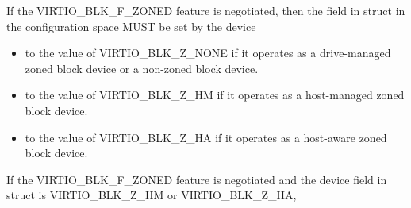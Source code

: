 If the VIRTIO_BLK_F_ZONED feature is negotiated, then the  field in
 struct in the configuration space MUST be set by the device
\begin{itemize}
\item to the value of VIRTIO_BLK_Z_NONE if it operates as a drive-managed
    zoned block device or a non-zoned block device.

\item to the value of VIRTIO_BLK_Z_HM if it operates as a host-managed zoned
    block device.

\item to the value of VIRTIO_BLK_Z_HA if it operates as a host-aware zoned
    block device.
\end{itemize}

If the VIRTIO_BLK_F_ZONED feature is negotiated and the device 
field in  struct is VIRTIO_BLK_Z_HM or VIRTIO_BLK_Z_HA,

